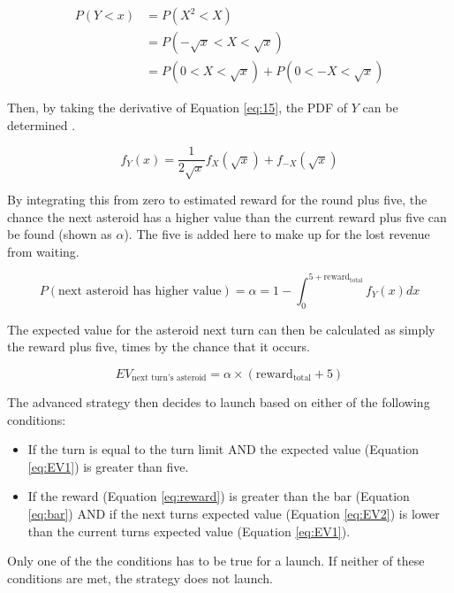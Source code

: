 \documentclass[11pt, twoside]{article}
\begin{document}
\begin{align}
	P(Y < x) & = P(X^2 < X)\nonumber \\
	& = P(−\sqrt{x}<X<\sqrt{x})\nonumber \\
	& = P(0 < X < \sqrt{x}) + P(0 < -X < \sqrt{x}) \label{eq:15}
\end{align}

\vspace{0.2cm}Then, by taking the derivative of Equation \ref{eq:15}, the PDF of $Y$ can be determined \cite{813462}.

\begin{equation}
	f_{Y}(x) = \frac{1}{2\sqrt{x}}f_{X}(\sqrt{x})+f_{-X}(\sqrt{x}) \nonumber 
\end{equation}

By integrating this from zero to estimated reward for the round plus five, the chance the next asteroid has a higher value than the current reward plus five can be found (shown as $\alpha$). The five is added here to make up for the lost revenue from waiting.

\begin{equation}
	P(\text{next asteroid has higher value}) = \alpha = 1 - \int_{0}^{5+\text{reward}_{\text{total}}} f_{Y}(x) dx \nonumber 
\end{equation}

The expected value for the asteroid next turn can then be calculated as simply the reward plus five, times by the chance that it occurs.

\begin{equation}
	EV_{\text{next turn's asteroid}} = \alpha \times (\text{reward}_{\text{total}} + 5)
	\label{eq:EV2}
\end{equation}

The advanced strategy then decides to launch based on either of the following conditions:
\begin{itemize}
	\item If the turn is equal to the turn limit AND the expected value (Equation \ref{eq:EV1}) is greater than five.
	\item If the reward (Equation \ref{eq:reward}) is greater than the bar (Equation \ref{eq:bar}) AND if the next turns expected value (Equation \ref{eq:EV2}) is lower than the current turns expected value (Equation \ref{eq:EV1}).
\end{itemize}

Only one of the the conditions has to be true for a launch. If neither of these conditions are met, the strategy does not launch.
\end{document}
